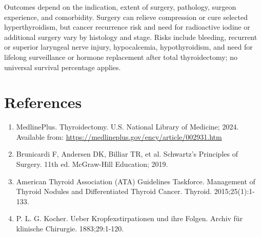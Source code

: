 Outcomes depend on the indication, extent of surgery, pathology, surgeon experience, and comorbidity. Surgery can relieve compression or cure selected hyperthyroidism, but cancer recurrence risk and need for radioactive iodine or additional surgery vary by histology and stage. Risks include bleeding, recurrent or superior laryngeal nerve injury, hypocalcemia, hypothyroidism, and need for lifelong surveillance or hormone replacement after total thyroidectomy; no universal survival percentage applies.

\section*{References}
\begin{enumerate}
  \item MedlinePlus. Thyroidectomy. U.S. National Library of Medicine; 2024. Available from: \url{https://medlineplus.gov/ency/article/002931.htm}
  
  \item Brunicardi F, Andersen DK, Billiar TR, et al. Schwartz's Principles of Surgery. 11th ed. McGraw-Hill Education; 2019.
  
  \item American Thyroid Association (ATA) Guidelines Taskforce. Management of Thyroid Nodules and Differentiated Thyroid Cancer. Thyroid. 2015;25(1):1-133.
  
  \item P. L. G. Kocher. Ueber Kropfexstirpationen und ihre Folgen. Archiv f\"ur klinische Chirurgie. 1883;29:1-120.
\end{enumerate}

\clearpage
